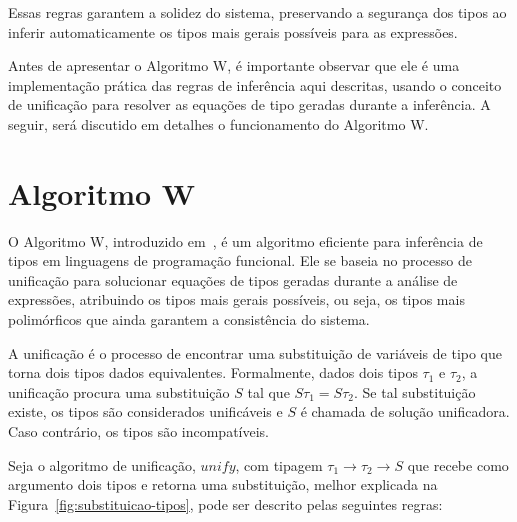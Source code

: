 Essas regras garantem a solidez do sistema, preservando a segurança dos tipos ao inferir automaticamente os tipos mais gerais possíveis para as expressões.

Antes de apresentar o Algoritmo W, é importante observar que ele é uma implementação prática das regras de inferência aqui descritas, usando o conceito de unificação para resolver as equações de tipo geradas durante a inferência.
A seguir, será discutido em detalhes o funcionamento do Algoritmo W.

\section{Algoritmo W}\label{sec:w-algo}

O Algoritmo W, introduzido em~, é um algoritmo eficiente para inferência de tipos em linguagens de programação funcional.
Ele se baseia no processo de unificação para solucionar equações de tipos geradas durante a análise de expressões, atribuindo os tipos mais gerais possíveis, ou seja, os tipos mais polimórficos que ainda garantem a consistência do sistema.

A unificação é o processo de encontrar uma substituição de variáveis de tipo que torna dois tipos dados equivalentes.
Formalmente, dados dois tipos $\tau_1$ e $\tau_2$, a unificação procura uma substituição $S$ tal que $S\tau_1 = S\tau_2$.
Se tal substituição existe, os tipos são considerados unificáveis e $S$ é chamada de solução unificadora.
Caso contrário, os tipos são incompatíveis.

Seja o algoritmo de unificação, $unify$, com tipagem $\tau_1 \to \tau_2 \to S$ que recebe como argumento dois tipos e retorna uma substituição, melhor explicada na Figura~\ref{fig:substituicao-tipos}, pode ser descrito pelas seguintes regras:

